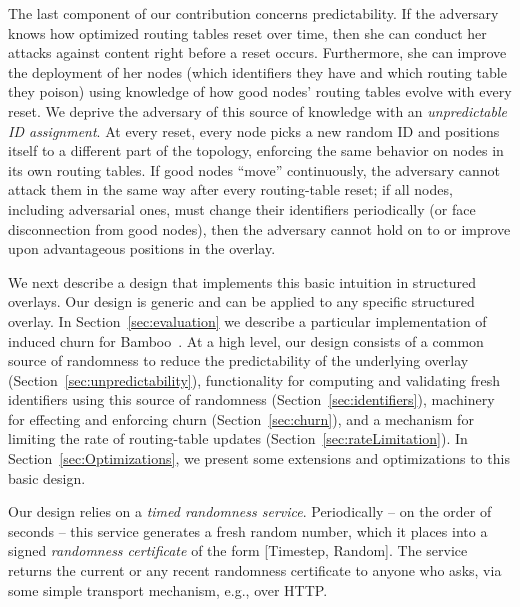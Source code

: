 \documentclass[10pt,twocolumn]{article}
\begin{document}
The last component of our contribution concerns predictability.  If the
adversary knows how optimized routing tables reset over time, then she
can conduct her attacks against content right before a reset
occurs. Furthermore, she can improve the deployment of her nodes (which
identifiers they have and which routing table they poison) using
knowledge of how good nodes' routing tables evolve with every reset.  We
deprive the adversary of this source of knowledge with
an \emph{unpredictable ID assignment}.  At every reset, every node picks a
new random ID and positions itself to a different part
of the topology, enforcing the same behavior on nodes in its own routing
tables.  If
good nodes ``move'' continuously, the adversary cannot attack them in
the same way after every routing-table reset; if all nodes, including
adversarial ones, must change their identifiers periodically (or face
disconnection from good nodes), then the adversary cannot hold on to
or improve upon advantageous positions in the
overlay.

We next describe a design that implements this basic intuition in
structured overlays.
Our design is generic and can be applied to any
specific structured overlay.  In Section~\ref{sec:evaluation} we describe a
particular implementation of induced churn for
Bamboo~\cite{Rhea2004}.
At a high level, our design consists of a common source of randomness to
reduce the predictability of the underlying overlay
(Section~\ref{sec:unpredictability}), functionality for computing and
validating fresh identifiers using this source of randomness
(Section~\ref{sec:identifiers}), machinery for effecting and enforcing
churn  (Section~\ref{sec:churn}), and a
mechanism for limiting the rate of routing-table updates
(Section~\ref{sec:rateLimitation}).  In
Section~\ref{sec:Optimizations}, we
present some extensions and optimizations to this basic design.


\label{sec:unpredictability}

Our design relies on a \emph{timed randomness service}.
Periodically -- on the order of seconds -- this service
generates a fresh random number, which it places into a signed
\emph{randomness certificate} of the form [Timestep, Random].  The
service returns the current or any recent
randomness
certificate to anyone who asks, via some simple
transport mechanism, e.g., over HTTP.
\end{document}
